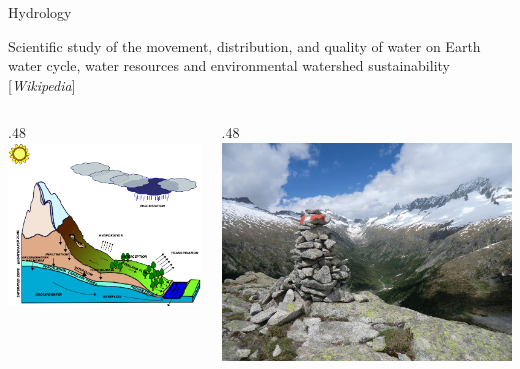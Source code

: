 \documentclass[ignorenonframetext,]{beamer}
\def\begincols{\begin{columns}}
\def\begincol{\begin{column}}
\def\endcol{\end{column}}
\def\endcols{\end{columns}}
\begin{document}
\begin{frame}{Hydrology}

Scientific study of the movement, distribution, and quality of water on
Earth water cycle, water resources and environmental watershed
sustainability {[}\emph{Wikipedia}{]} \begincols
\begincol{.48\textwidth}
\includegraphics[width=1.00000\textwidth]{resources/images/geotop_landscape.png}\\
\endcol
\begincol{.48\textwidth}
\includegraphics[width=1.00000\textwidth]{resources/images/valdifumo.jpg}\\
\endcol
\endcols

\end{frame}
\end{document}

